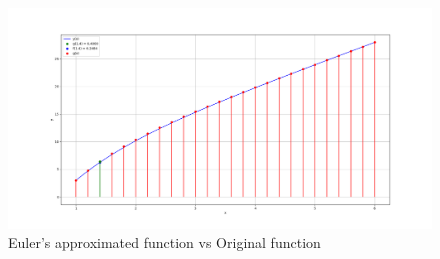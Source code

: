 \documentclass[journal,12pt,onecolumn]{IEEEtran}
\theoremstyle{remark}
\begin{document}
    \begin{figure}[!ht]    
    \centering
\graphicspath{ {figs/} }
\includegraphics[width=\columnwidth]{graph_1}
\caption{ Euler's approximated function vs Original function  }
\label{graph:ee25-gate3-graph}
\end{figure}
\end{document}
